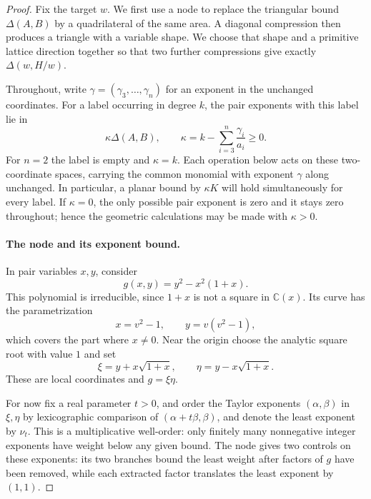 \begin{proof}
Fix the target $w$.  We first use a node to replace the triangular bound $\Delta(A,B)$ by a quadrilateral of the same area.  A diagonal compression then produces a triangle with a variable shape.  We choose that shape and a primitive lattice direction together so that two further compressions give exactly $\Delta(w,H/w)$.

Throughout, write $\gamma=(\gamma_3,\ldots,\gamma_n)$ for an exponent in the unchanged coordinates.  For a label occurring in degree $k$, the pair exponents with this label lie in
\begin{equation}\label{eq:residual-degree}
 \kappa\Delta(A,B),\qquad
 \kappa=k-\sum_{i=3}^n\frac{\gamma_i}{a_i}\ge0.
\end{equation}
For $n=2$ the label is empty and $\kappa=k$.  Each operation below acts on these two-coordinate spaces, carrying the common monomial with exponent $\gamma$ along unchanged.  In particular, a planar bound by $\kappa K$ will hold simultaneously for every label.  If $\kappa=0$, the only possible pair exponent is zero and it stays zero throughout; hence the geometric calculations may be made with $\kappa>0$.

\paragraph{The node and its exponent bound.}
In pair variables $x,y$, consider
\begin{equation}\label{eq:node-polynomial}
 g(x,y)=y^2-x^2(1+x).
\end{equation}
This polynomial is irreducible, since $1+x$ is not a square in $\mathbb{C}(x)$. Its curve has the parametrization
\begin{equation}\label{eq:node-parametrization}
 x=v^2-1,\qquad y=v(v^2-1),
\end{equation}
which covers the part where $x\ne0$.  Near the origin choose the analytic square root with value $1$ and set
\begin{equation}\label{eq:node-coordinates}
 \xi=y+x\sqrt{1+x},\qquad
 \eta=y-x\sqrt{1+x}.
\end{equation}
These are local coordinates and $g=\xi\eta$.

For now fix a real parameter $t>0$, and order the Taylor exponents $(\alpha,\beta)$ in $\xi,\eta$ by lexicographic comparison of $(\alpha+t\beta,\beta)$, and denote the least exponent by $\nu_t$. This is a multiplicative well-order: only finitely many nonnegative integer exponents have weight below any given bound.  The node gives two controls on these exponents: its two branches bound the least weight after factors of $g$ have been removed, while each extracted factor translates the least exponent by $(1,1)$.


\end{proof}
